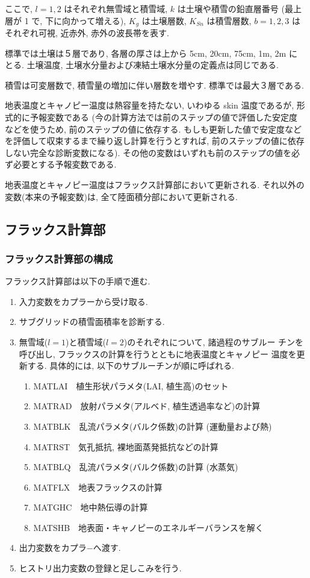 ここで, $l=1,2$ はそれぞれ無雪域と積雪域, $k$ は土壌や積雪の鉛直層番号
(最上層が 1 で, 下に向かって増える), $K_g$ は土壌層数, $K_{Sn}$ は積雪層数,
$b=1,2,3$ はそれぞれ可視, 近赤外, 赤外の波長帯を表す. 

標準では土壌は５層であり, 各層の厚さは上から 5cm, 20cm, 75cm, 1m, 2m に
とる. 土壌温度, 土壌水分量および凍結土壌水分量の定義点は同じである. 

積雪は可変層数で, 積雪量の増加に伴い層数を増やす. 標準では最大３層である. 

地表温度とキャノピー温度は熱容量を持たない, いわゆる skin 温度であるが,
形式的に予報変数である (今の計算方法では前のステップの値で評価した安定度
などを使うため, 前のステップの値に依存する. もしも更新した値で安定度など
を評価して収束するまで繰り返し計算を行うとすれば, 前のステップの値に依存
しない完全な診断変数になる). その他の変数はいずれも前のステップの値を必
ず必要とする予報変数である. 

地表温度とキャノピー温度はフラックス計算部において更新される. 
それ以外の変数(本来の予報変数)は, 全て陸面積分部において更新される. 

\subsection{フラックス計算部}

\subsubsection{フラックス計算部の構成}

フラックス計算部は以下の手順で進む. 
\begin{enumerate}
 \item 入力変数をカプラーから受け取る. 
 \item サブグリッドの積雪面積率を診断する. 
 \item 無雪域($l=1$)と積雪域($l=2$)のそれぞれについて, 諸過程のサブルー
       チンを呼び出し, フラックスの計算を行うとともに地表温度とキャノピー
       温度を更新する. 具体的には, 以下のサブルーチンが順に呼ばれる. 
   \begin{enumerate}
    \item MATLAI\ \ 植生形状パラメタ(LAI, 植生高)のセット
    \item MATRAD\ \ 放射パラメタ(アルベド, 植生透過率など)の計算
    \item MATBLK\ \ 乱流パラメタ(バルク係数)の計算 (運動量および熱)
    \item MATRST\ \ 気孔抵抗, 裸地面蒸発抵抗などの計算
    \item MATBLQ\ \ 乱流パラメタ(バルク係数)の計算 (水蒸気)
    \item MATFLX\ \ 地表フラックスの計算
    \item MATGHC\ \ 地中熱伝導の計算
    \item MATSHB\ \ 地表面・キャノピーのエネルギーバランスを解く
   \end{enumerate}
 \item 出力変数をカプラ−へ渡す. 
 \item ヒストリ出力変数の登録と足しこみを行う. 
\end{enumerate}

